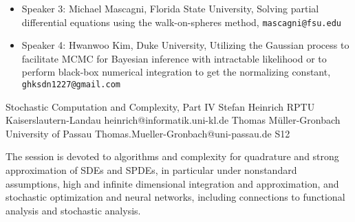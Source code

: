 \begin{session}
\begin{itemize}
 \item Speaker 3: Michael Mascagni, Florida State University, Solving partial differential equations using the walk-on-spheres method, \texttt{mascagni@fsu.edu}
 \item Speaker 4: Hwanwoo Kim, Duke University, Utilizing the Gaussian process to facilitate MCMC for Bayesian inference with intractable likelihood or to perform black-box numerical integration to get the normalizing constant, \texttt{ghksdn1227@gmail.com}
 \end{itemize}
 \begin{comment}
 If you would like to include references, please do so by creating a simple list numbered by [1], [2], [3], \ldots. See example below.
 Please do not use the \texttt{bibliography} environment or \texttt{bibtex} files.
 \begin{enumerate}
 \item[{[1]}] Niederreiter, Harald (1992). {\it Random number generation and quasi-Monte Carlo methods}. Society for Industrial and Applied Mathematics (SIAM).
 \item[{[2]}] Roberts, Gareth O, \& Rosenthal, Jeffrey S. (2002).  Optimal scaling for various Metropolis-Hastings algorithms, \textbf{16}(4), 351--367.
 \end{enumerate}
 Equations may be used if they are referenced. Please note that the equation numbers may be different (but will be cross-referenced correctly) in the final program book.
 \end{comment}
\end{session}



\clearpage

\begin{session}
 {Stochastic Computation and Complexity, Part IV}%
 {Stefan Heinrich}%
 {RPTU Kaiserslautern-Landau}%
 {heinrich@informatik.uni-kl.de}%
 {Thomas M\"uller-Gronbach}%
 {University of Passau}%
 {Thomas.Mueller-Gronbach@uni-passau.de}%
 {S12}%
 {}%

 The session is devoted to algorithms and complexity for
 quadrature and strong approximation of SDEs and SPDEs, in particular under nonstandard assumptions,
 high and infinite dimensional integration and approximation, and
 stochastic optimization and neural networks,
 including connections to functional analysis and stochastic analysis.
 \medskip
\end{session}

